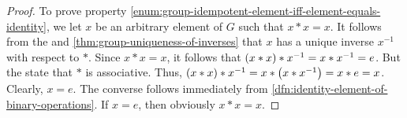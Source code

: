 \begin{proof}
    \vspace{0.3cm}
    \noindent
    To prove property \ref{enum:group-idempotent-element-iff-element-equals-identity}, we let \( x \) be an arbitrary
    element of \( G \) such that \( x \ast x = x \). It follows from the  and \cref{thm:group-uniqueness-of-inverses}
    that \( x \) has a unique inverse \( x^{-1} \) with respect to \( \ast \). Since \( x \ast x = x \), it follows
    that \( \mleft( x \ast x \mright) \ast x^{-1} = x \ast x^{-1} = e \). But the  state that \( \ast \) is associative.
    Thus, \( \mleft( x \ast x \mright) \ast x^{-1} = x \ast \mleft( x \ast x^{-1} \mright) = x \ast e = x \). Clearly, \( x = e \). The converse follows
    immediately from \cref{dfn:identity-element-of-binary-operations}. If \( x = e \), then obviously \( x \ast x = x \).
\end{proof}

